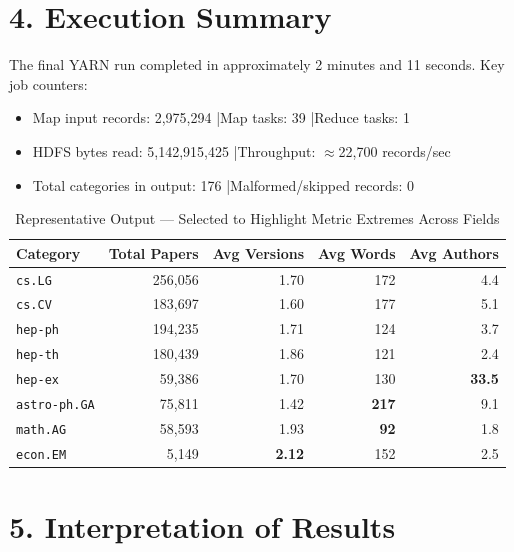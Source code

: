 \documentclass[11pt,a4paper]{article}
\begin{document}
\section*{4. Execution Summary}
The final YARN run completed in approximately 2 minutes and 11 seconds. Key job counters:
\begin{itemize}
  \item Map input records: 2,975,294 \quad|\quad Map tasks: 39 \quad|\quad Reduce tasks: 1
  \item HDFS bytes read: 5,142,915,425 \quad|\quad Throughput: $\approx$22,700 records/sec
  \item Total categories in output: 176 \quad|\quad Malformed/skipped records: 0
\end{itemize}

\begin{table}[ht]
  \centering
  \caption{Representative Output --- Selected to Highlight Metric Extremes Across Fields}
  \label{tab:sample}
  \small
  \begin{tabularx}{\linewidth}{@{}lrrrr@{}}
    \toprule
    Category             & Total Papers & Avg Versions  & Avg Words    & Avg Authors   \\
    \midrule
    \texttt{cs.LG}       & 256,056      & 1.70          & 172          & 4.4           \\
    \texttt{cs.CV}       & 183,697      & 1.60          & 177          & 5.1           \\
    \texttt{hep-ph}      & 194,235      & 1.71          & 124          & 3.7           \\
    \texttt{hep-th}      & 180,439      & 1.86          & 121          & 2.4           \\
    \texttt{hep-ex}      & 59,386       & 1.70          & 130          & \textbf{33.5} \\
    \texttt{astro-ph.GA} & 75,811       & 1.42          & \textbf{217} & 9.1           \\
    \texttt{math.AG}     & 58,593       & 1.93          & \textbf{92}  & 1.8           \\
    \texttt{econ.EM}     & 5,149        & \textbf{2.12} & 152          & 2.5           \\
    \bottomrule
  \end{tabularx}
\end{table}

\section*{5. Interpretation of Results}
\end{document}
